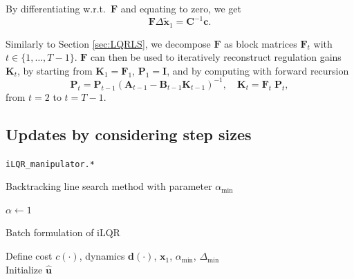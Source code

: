 \documentclass[10pt,a4paper]{article} %
\newcommand{\filename}[1]{\colorbox{rr2}{\color{white}\texttt{#1}}}
\begin{document}
By differentiating w.r.t.\ $\bm{F}$ and equating to zero, we get
\begin{equation}
	\bm{F} \Delta\bm{\tilde{x}}_1 = \bm{C}^{-1} \bm{c}.
\end{equation}

Similarly to Section \ref{sec:LQRLS}, we decompose $\bm{F}$ as block matrices $\bm{F}_t$ with $t\in\{1,\ldots,T-1\}$. $\bm{F}$ can then be used to iteratively reconstruct regulation gains $\bm{K}_t$, by starting from $\bm{K}_1=\bm{F}_1$, $\bm{P}_1=\bm{I}$, and by computing with forward recursion
\begin{equation}
	\bm{P}_t = \bm{P}_{t-1} {(\bm{A}_{t-1} - \bm{B}_{t-1} \bm{K}_{t-1})}^{-1}, \quad
	\bm{K}_t = \bm{F}_t \; \bm{P}_t,
\end{equation}
from $t=2$ to $t=T-1$.


\subsection{Updates by considering step sizes}
\begin{flushright}
\filename{iLQR\_manipulator.*}
\end{flushright}

\begin{algorithm}
\caption{Backtracking line search method with parameter $\alpha_{\min}$}
\label{alg:linesearch}
$\alpha \gets 1$ \\
\end{algorithm}

\begin{algorithm}
\caption{Batch formulation of iLQR}
\label{alg:iLQRbatch}
Define cost $c(\cdot)$, dynamics $\bm{d}(\cdot)$, $\bm{x}_1$, $\alpha_{\min}$, $\Delta_{\min}$ \\
Initialize $\bm{\hat{u}}$ \\
\end{algorithm}
\end{document}
